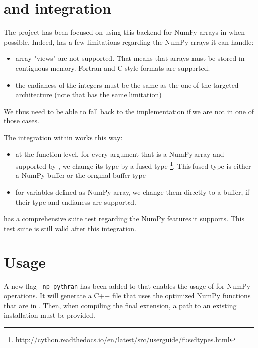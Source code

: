 \documentclass{deliverablereport}
\begin{document}
\section{\Cython and \Pythran integration}

The project has been focused on using this \Pythran backend for NumPy arrays in
\Cython when possible. Indeed, \Pythran has a few limitations regarding the NumPy
arrays it can handle:

\begin{itemize}
  \item array "views" are not supported. That means that arrays must be stored
    in contiguous memory. Fortran and C-style formats are supported.
  \item the endianess of the integers must be the same as the one of the
    targeted architecture (note that \Cython has the same limitation)
\end{itemize}

We thus need to be able to fall back to the \Cython implementation if we are not
in one of those cases.

The integration within \Cython works this way:

\begin{itemize}
  \item at the function level, for every argument that is a NumPy array and
    supported by \Pythran, we change its type by a fused type
    \footnote{\url{http://cython.readthedocs.io/en/latest/src/userguide/fusedtypes.html}}.
    This fused type is either a \Pythran NumPy buffer or the original \Cython
    buffer type
  \item for variables defined as NumPy array, we change them directly to a
    \Pythran buffer, if their type and endianess are supported.
\end{itemize}

\Cython has a comprehensive suite test regarding the NumPy features it supports.
This test suite is still valid after this integration.

\section{Usage}

A new flag {\tt --np-pythran} has been added to \Cython that enables the usage
of \Pythran for NumPy operations. It will generate a C++ file that uses the
optimized NumPy functions that are in \Pythran. 
Then, when compiling the final extension, a path to an existing \Pythran
installation must be provided.
\end{document}
